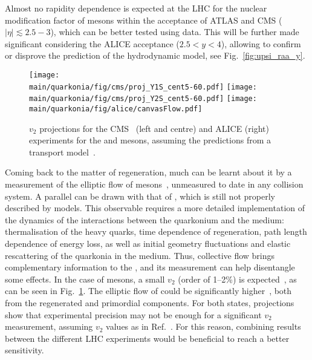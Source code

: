 \documentclass[../report.tex]{subfiles}
\providecommand{\main}{..}
\begin{document}
Almost no rapidity dependence is expected at the LHC for the nuclear modification factor of \PGU mesons within the acceptance of ATLAS and CMS ($|\eta|\lesssim 2.5-3$), which can be better
tested using \RunsThreeFour data. 
This will be further made significant considering the ALICE acceptance ($2.5<y<4$), allowing to confirm or disprove the prediction of the hydrodynamic model, see Fig.~\ref{fig:upsi_raa_y}.


\begin{figure}
\begin{center}
 \texttt{[image: \\main/quarkonia/fig/cms/proj\_Y1S\_cent5-60.pdf]}
 \texttt{[image: \\main/quarkonia/fig/cms/proj\_Y2S\_cent5-60.pdf]}
 \texttt{[image: \\main/quarkonia/fig/alice/canvasFlow.pdf]}
\end{center}

 \caption{$v_2$ projections for the CMS~\cite{CMS-PAS-FTR-18-024} (left and centre) and ALICE (right) experiments for the  and  mesons, assuming the predictions from a transport model~\cite{Du:2017qkv}.}
 \label{fig:upsi_v2}
\end{figure}

Coming back to the matter of regeneration, much can be learnt about it by a measurement of the elliptic flow of  mesons~\cite{Das:2018xel}, 
unmeasured to date in any collision system. 
A parallel can be
drawn with that of \PJgy, which is still not properly described by models. This observable requires a more detailed implementation of the dynamics of the interactions between the 
quarkonium and the medium: thermalisation of the heavy quarks, time dependence of regeneration, path length dependence of energy loss, as well as initial geometry fluctuations and 
elastic rescattering of the quarkonia in the medium. Thus, collective flow brings complementary information to the \raa, and its measurement can help disentangle some
effects. In the case of  mesons, a small $v_2$ (order of 1--2\%) is expected~\cite{Du:2017qkv,Yao:2018zrg,Bhaduri:2018iwr}, as can be seen in Fig.~\ref{fig:upsi_v2}.%
The elliptic flow of  could be significantly higher~\cite{Du:2017qkv,Bhaduri:2018iwr}, both from the regenerated and primordial
components. For both states, projections show that experimental precision may not be enough for a significant $v_2$ measurement, assuming $v_2$ values as in Ref.~\cite{Du:2017qkv}. For this reason,
combining results between the different LHC experiments would be beneficial to reach a better sensitivity.
\end{document}
